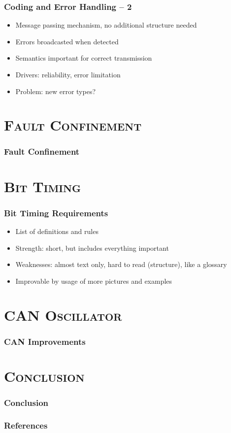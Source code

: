 \documentclass[xcolor=x11names,compress]{beamer}
\renewcommand{\(}{\begin{columns}}
\renewcommand{\)}{\end{columns}}
\newcommand{\<}[1]{\begin{column}{#1}}
\renewcommand{\>}{\end{column}}
\begin{document}
\begin{frame}
  \frametitle{Coding and Error Handling -- 2}

  \begin{itemize}
    \item Message passing mechanism, no additional structure needed
    \item Errors broadcasted when detected
    \item Semantics important for correct transmission
    \item Drivers: reliability, error limitation
    \item Problem: new error types?
  \end{itemize}

\end{frame}


\section{\scshape Fault Confinement}
\begin{frame}
  \frametitle{Fault Confinement}

\end{frame}


\section{\scshape Bit Timing}
\begin{frame}
  \frametitle{Bit Timing Requirements}


\begin{itemize}
    \item List of definitions and rules
    \item Strength: short, but includes everything important
    \item Weaknesses: almost text only, hard to read (structure),
        like a glossary
    \item Improvable by usage of more pictures and examples

\end{itemize}


\end{frame}


\section{\scshape CAN Oscillator}
\begin{frame}
  \frametitle{CAN Improvements}
\end{frame}

\section{\scshape Conclusion}

\begin{frame}
  \frametitle{Conclusion}
\end{frame}

\begin{frame}
  \frametitle{References}
  \scriptsize
  
  
\end{frame}
\end{document}
